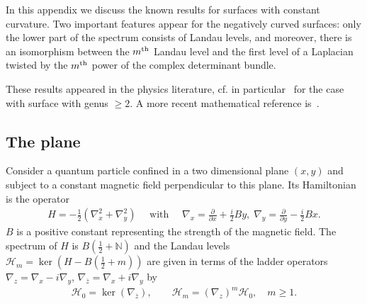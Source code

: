 \documentclass[10pt,a4paper]{article}
\theoremstyle{definition}
\numberwithin{equation}{section}
\newcommand{\N}{{\mathbb{N}}}
\newcommand{\con}{\overline}
\newcommand{\op}{\operatorname}
\newcommand{\Hilb}{\mathcal{H}}
\begin{document}
In this appendix we discuss the known results for surfaces with constant curvature. Two important features appear for the negatively curved surfaces: only the lower part of the spectrum consists of Landau levels, and moreover, there is an isomorphism between the $m^{\rm th}$ Landau level and the first level of a Laplacian twisted by the $m^{\rm th}$ power of the complex determinant bundle.

These results appeared in the physics literature, cf. in particular~\cite{IeLi94} for the case with surface with genus $\geqslant 2$. A more recent mathematical reference is~\cite{Te06}.

\subsection*{The plane~\cite{La30}}
Consider a quantum particle confined in a two dimensional plane $(x,y)$ and subject to a constant magnetic field perpendicular to this plane. Its Hamiltonian is the operator
\begin{gather}\label{eq:laplacian_landau}
H = -\tfrac{1}{2} \left(\nabla_x^2 + \nabla_y^2\right) \quad \text{ with } \quad \nabla_x = \tfrac{\partial}{ \partial x} +
\tfrac{i}{2} B y,\; \nabla_y = \tfrac{\partial}{\partial y} - \tfrac{i}{2} Bx.
\end{gather}
$B$ is a positive constant representing the strength of the magnetic field. The spectrum of $H$ is $B(\frac{1}{2} + \N)$ and the Landau levels $\Hilb_m =
\op{ker} (H - B(\frac{1}{2} + m))$ are given in terms of the ladder operators $\nabla_z = \nabla_x - i \nabla_y$, $\nabla_{\con{z}} = \nabla_x + i
\nabla_y$ by
\begin{gather}\label{eq:landau_level}
\Hilb_0 = \op{ker} (\nabla_{\con z}), \qquad \Hilb_m = (\nabla_z)^m
\Hilb_0, \quad m \geqslant 1.
\end{gather}
\end{document}
